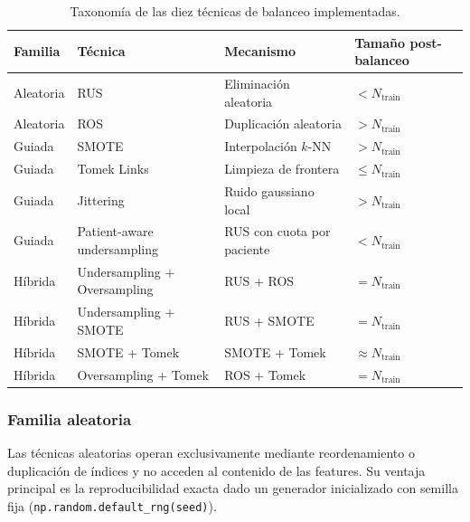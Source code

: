 \begin{table}[ht]
\centering
\caption{Taxonomía de las diez técnicas de balanceo implementadas.}
\label{tab:taxonomia_tecnicas}
\small
\begin{tabular}{llll}
\toprule
\textbf{Familia} & \textbf{Técnica} & \textbf{Mecanismo} & \textbf{Tamaño post-balanceo} \\
\midrule
Aleatoria & RUS  & Eliminación aleatoria          & $< N_\text{train}$ \\
Aleatoria & ROS  & Duplicación aleatoria          & $> N_\text{train}$ \\
\midrule
Guiada    & SMOTE                    & Interpolación $k$-NN           & $> N_\text{train}$ \\
Guiada    & Tomek Links              & Limpieza de frontera           & $\leq N_\text{train}$ \\
Guiada    & Jittering                & Ruido gaussiano local          & $> N_\text{train}$ \\
Guiada    & Patient-aware undersampling & RUS con cuota por paciente  & $< N_\text{train}$ \\
\midrule
Híbrida   & Undersampling + Oversampling & RUS + ROS                  & $= N_\text{train}$ \\
Híbrida   & Undersampling + SMOTE        & RUS + SMOTE                & $= N_\text{train}$ \\
Híbrida   & SMOTE + Tomek                & SMOTE + Tomek              & $\approx N_\text{train}$ \\
Híbrida   & Oversampling + Tomek         & ROS + Tomek                & $= N_\text{train}$ \\
\bottomrule
\end{tabular}
\end{table}
\subsubsection{Familia aleatoria}
\label{subsubsec:familia_aleatoria}

Las técnicas aleatorias operan exclusivamente mediante reordenamiento o duplicación de índices y no acceden al contenido de las features. Su ventaja principal es la reproducibilidad exacta dado un generador inicializado con semilla fija (\texttt{np.random.default\_rng(seed)}).

